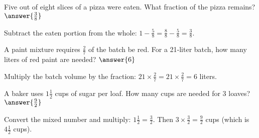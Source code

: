 \documentclass{ximera}
\begin{document}
\begin{problem}
Five out of eight slices of a pizza were eaten. What fraction of the pizza remains? \(\answer{\frac{3}{8}}\)
\begin{feedback}
Subtract the eaten portion from the whole: \(1-\frac{5}{8}=\frac{8}{8}-\frac{5}{8}=\frac{3}{8}\).
\end{feedback}
\end{problem}

\begin{problem}
A paint mixture requires \(\frac{2}{7}\) of the batch be red. For a 21‑liter batch, how many liters of red paint are needed? \(\answer{6}\)
\begin{feedback}
Multiply the batch volume by the fraction: \(21\times\frac{2}{7}=21\times\frac{2}{7}=6\) liters.
\end{feedback}
\end{problem}

\begin{problem}
A baker uses \(1\frac{1}{2}\) cups of sugar per loaf. How many cups are needed for 3 loaves? \(\answer{\frac{9}{2}}\)
\begin{feedback}
Convert the mixed number and multiply: \(1\frac{1}{2}=\frac{3}{2}\). Then \(3\times\frac{3}{2}=\frac{9}{2}\) cups (which is \(4\frac{1}{2}\) cups).
\end{feedback}
\end{problem}

\end{document}
